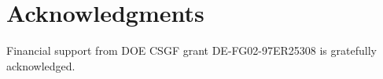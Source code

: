\section*{Acknowledgments}

Financial support from DOE CSGF grant DE-FG02-97ER25308 is gratefully acknowledged.